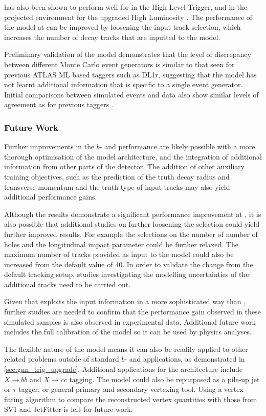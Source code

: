 \GNN has also been shown to perform well for \btagging in the High Level Trigger, and in the projected environment for the upgraded High Luminosity \LHC.
The performance of the model at \highpt can be improved by loosening the input track selection, which increases the number of \bhadron decay tracks that are inputted to the model.

Preliminary validation of the model demonstrates that the level of discrepancy between different Monte Carlo event generators is similar to that seen for previous ATLAS ML based taggers such as DL1r, suggesting that the model has not learnt additional information that is specific to a single event generator.
Initial comparisons between simulated events and data also show similar levels of agreement as for previous taggers \cite{gn2publicplots}.


\subsubsection{Future Work}
Further improvements in the $b$- and \ctagging performance are likely possible with a more thorough optimisation of the model architecture, and the integration of additional information from other parts of the \ATLAS detector.
The addition of other auxiliary training objectives, such as the prediction of the truth \bhadron decay radius and transverse momentum and the truth type of input tracks may also yield additional performance gains.

Although the results demonstrate a significant performance improvement at \highpt, it is also possible that additional studies on further loosening the selection could yield further improved results.
For example the selections on the number of number of holes and the longitudinal impact parameter could be further relaxed.
The maximum number of tracks provided as input to the model could also be increased from the default value of 40.
In order to validate the change from the default tracking setup, studies investigating the modelling uncertainties of the additional tracks need to be carried out.

Given that \GNN exploits the input information in a more sophisticated way than \DLr, further studies are needed to confirm that the performance gain observed in these simulated samples is also observed in experimental data.
Additional future work includes the full calibration of the model so it can be used by physics analyses.

The flexible nature of the model means it can also be readily applied to other related problems outside of standard $b$- and \ctagging applications, as demonstrated in \cref{sec:gnn_trig_upgrade}.
Additional applications for the architecture include $X \rightarrow bb$ and $X \rightarrow cc$ tagging.
The model could also be repurposed as a pile-up jet or $\tau$ tagger, or general primary and secondary vertexing tool.
Using a vertex fitting algorithm to compare the reconstructed vertex quantities with those from SV1 and JetFitter is left for future work.
